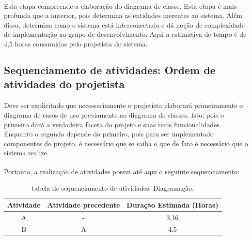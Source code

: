 \documentclass[12pt,a4paper]{article}
\begin{document}
		\paragraph{}Esta etapa compreende a elaboração do diagrama de classe. Esta etapa é mais profunda que a anterior, pois determina as entidades inerentes ao sistema. Além disso, determina como o sistema está interconectado e dá noção de complexidade de implementação ao grupo de desenvolvimento. Aqui a estimativa de tempo é de 4,5 horas consumidas pelo projetista do sistema.
		\subsection{Sequenciamento de atividades: Ordem de atividades do projetista}
		\paragraph{} Deve ser explicitado que necessariamente o projetista elaborará primeiramente o diagrama de casos de uso previamente ao diagrama de classes. Isto, pois o primeiro dará a verdadeira faceta do projeto e suas reais funcionalidades. Enquanto o segundo depende do primeiro, pois para ser implementado componentes do projeto, é necessário que se saiba o que de fato é necessário que o sistema realize.
		\paragraph{} Portanto, a realização de atividades possui até aqui o seguinte sequenciamento: \\
		\begin{table}[!ht]	
		\centering
		\begin{tabular}{|c|c|c|}
		\hline 
		Atividade & Atividade precedente & Duração Estimada (Horas) \\ 
		\hline 
		A & - & 3,16 \\ 
		\hline 
		B & A & 4,5 \\ 
		\hline 
		\end{tabular}
		\caption{tabela de sequenciamento de atividades: Diagramação.} 
		\end{table}
\end{document}
